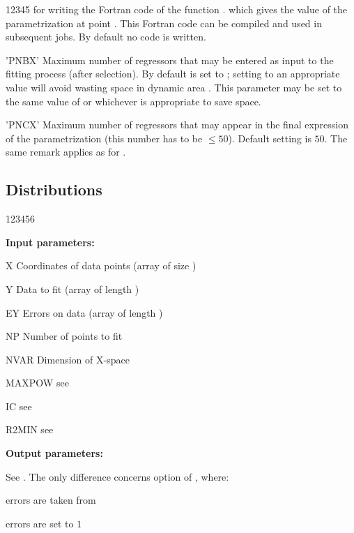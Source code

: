 \begin{DLtt}{12345}
for writing the Fortran code of the function .
which gives the value of the parametrization at point .
This Fortran code can be compiled and used in subsequent jobs.
By default no code is written.
\item['PNBX'] Maximum number of regressors that may be entered as input to the
fitting process (after selection).
By default  is set to ;
setting  to an appropriate value will avoid wasting space in
dynamic area .
This parameter may be set to the same value of
 or  whichever is appropriate to save space.
\item['PNCX'] Maximum number of regressors that may appear
in the final
expression of the parametrization (this number has to be $\leq 50$).
Default setting is $50$. The same remark applies as for .
\end{DLtt}
 
\subsection*{Distributions}
 
 
\begin{DLtt}{123456}
\item[{\rm\bf Input parameters:}]
\item[X] Coordinates of data points (array of size )
\item[Y] Data to fit (array of length )
\item[EY] Errors on data (array of length )
\item[NP] Number of points to fit
\item[NVAR] Dimension of X-space
\item[MAXPOW] see 
\item[IC] see 
\item[R2MIN] see 
\item[{\rm\bf Output parameters:}]
\item[ ] See .
     The only difference concerns option  of , where:
     \begin{UL}
         \item {} errors are taken from 
         \item {} errors are set to $1$
     \end{UL}
\end{DLtt}

